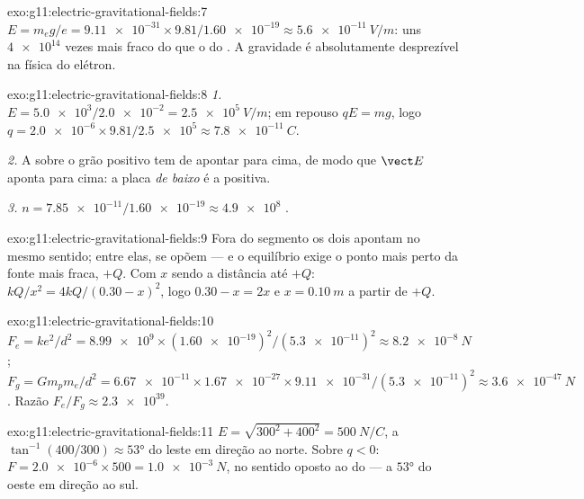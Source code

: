 \begin{solution}{exo:g11:electric-gravitational-fields:7}
$E = m_e g / e = \num{9.11e-31} \times 9.81 / \num{1.60e-19}
\approx \qty{5.6e-11}{V/m}$: uns $\num{4e14}$ vezes mais fraco do que o
 do . A gravidade é absolutamente desprezível na física
do elétron.
\end{solution}

\begin{solution}{exo:g11:electric-gravitational-fields:8}
\emph{1.} $E = \num{5.0e3} / \num{2.0e-2} = \qty{2.5e5}{V/m}$; em
repouso $qE = mg$, logo
$q = \num{2.0e-6} \times 9.81 / \num{2.5e5} \approx \qty{7.8e-11}{C}$.

\emph{2.} A  sobre o grão positivo tem de apontar para cima, de modo
que $\vect E$ aponta para cima: a placa \emph{de baixo} é a positiva.

\emph{3.} $n = \num{7.85e-11} / \num{1.60e-19} \approx \num{4.9e8}$
.
\end{solution}

\begin{solution}{exo:g11:electric-gravitational-fields:9}
Fora do segmento os dois  apontam no mesmo sentido; entre elas, se
opõem --- e o equilíbrio exige o ponto mais perto da fonte mais fraca,
$+Q$. Com $x$ sendo a distância até $+Q$: $kQ/x^2 = 4kQ/(0.30 - x)^2$,
logo $0.30 - x = 2x$ e $x = \qty{0.10}{m}$ a partir de $+Q$.
\end{solution}

\begin{solution}{exo:g11:electric-gravitational-fields:10}
$F_e = ke^2/d^2 = \num{8.99e9} \times (\num{1.60e-19})^2 /
(\num{5.3e-11})^2 \approx \qty{8.2e-8}{N}$;
$F_g = G m_p m_e / d^2 = \num{6.67e-11} \times \num{1.67e-27} \times
\num{9.11e-31} / (\num{5.3e-11})^2 \approx \qty{3.6e-47}{N}$. Razão
$F_e / F_g \approx \num{2.3e39}$.
\end{solution}

\begin{solution}{exo:g11:electric-gravitational-fields:11}
$E = \sqrt{300^2 + 400^2} = \qty{500}{N/C}$, a
$\tan^{-1}(400/300) \approx \ang{53}$ do leste em direção ao norte. Sobre
$q < 0$: $F = \num{2.0e-6} \times 500 = \qty{1.0e-3}{N}$, no sentido
oposto ao do  --- a $\ang{53}$ do oeste em direção ao sul.
\end{solution}

